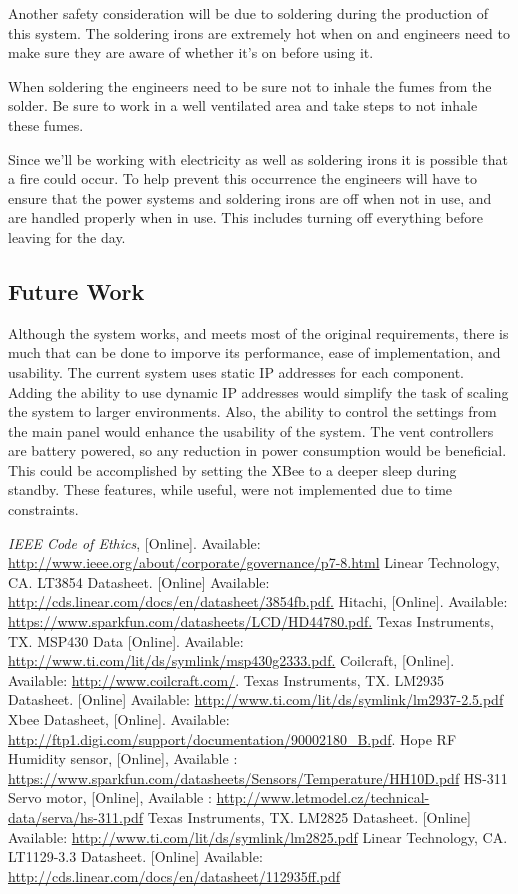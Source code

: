 Another safety consideration will be due to soldering during the production of this system. The soldering irons are extremely hot when on and engineers need to make sure they are aware of whether it's on before using it.

When soldering the engineers need to be sure not to inhale the fumes from the solder. Be sure to work in a well ventilated area and take steps to not inhale these fumes.

Since we'll be working with electricity as well as soldering irons it is possible that a fire could occur. To help prevent this occurrence the engineers will have to ensure that the power systems and soldering irons are off when not in use, and are handled properly when in use. This includes turning off everything before leaving for the day.

\subsection{Future Work}
Although the system works, and meets most of the original requirements, there is much that can be done to imporve its performance, ease of implementation, and usability.  The current system uses static IP addresses for each component.  Adding the ability to use dynamic IP addresses would simplify the task of scaling the system to larger environments.  Also, the ability to control the settings from the main panel would enhance the usability of the system. The vent controllers are battery powered, so any reduction in power consumption would be beneficial.  This could be accomplished by setting the XBee to a deeper sleep during standby. These features, while useful, were not implemented due to time constraints.

\begin{thebibliography}{10}
\textit{IEEE Code of Ethics}, [Online]. Available: \url{http://www.ieee.org/about/corporate/governance/p7-8.html}
Linear Technology, CA. LT3854 Datasheet. [Online] Available: \url{http://cds.linear.com/docs/en/datasheet/3854fb.pdf.}
Hitachi, [Online]. Available: \url{https://www.sparkfun.com/datasheets/LCD/HD44780.pdf.}
Texas Instruments, TX. MSP430 Data [Online]. Available: \url{http://www.ti.com/lit/ds/symlink/msp430g2333.pdf.}
Coilcraft, [Online]. Available: \url{http://www.coilcraft.com/}.
Texas Instruments, TX. LM2935 Datasheet. [Online] Available: \url{http://www.ti.com/lit/ds/symlink/lm2937-2.5.pdf}
Xbee Datasheet, [Online]. Available: \url{http://ftp1.digi.com/support/documentation/90002180\_B.pdf}.
Hope RF Humidity sensor, [Online], Available : \url{https://www.sparkfun.com/datasheets/Sensors/Temperature/HH10D.pdf}
HS-311 Servo motor, [Online], Available : \url{http://www.letmodel.cz/technical-data/serva/hs-311.pdf}
Texas Instruments, TX. LM2825 Datasheet. [Online] Available: \url{http://www.ti.com/lit/ds/symlink/lm2825.pdf}
Linear Technology, CA. LT1129-3.3 Datasheet. [Online] Available: \url{http://cds.linear.com/docs/en/datasheet/112935ff.pdf}
\end{thebibliography}
